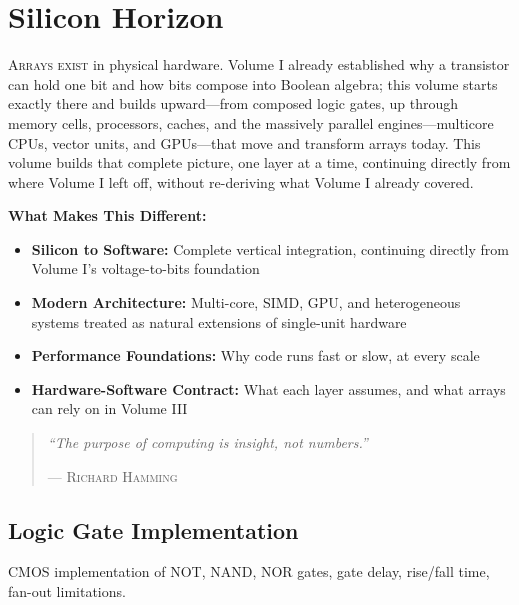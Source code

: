\part{Silicon Horizon}
\label{part:silicon-horizon}

\begin{volumeintro}
\lettrine[lines=3]{A}{rrays exist} in physical hardware. Volume I already established why a transistor can hold one bit and how bits compose into Boolean algebra; this volume starts exactly there and builds upward---from composed logic gates, up through memory cells, processors, caches, and the massively parallel engines---multicore CPUs, vector units, and GPUs---that move and transform arrays today. This volume builds that complete picture, one layer at a time, continuing directly from where Volume I left off, without re-deriving what Volume I already covered.

\vspace{1em}
\textbf{What Makes This Different:}
\begin{itemize}[noitemsep]
    \item \textbf{Silicon to Software:} Complete vertical integration, continuing directly from Volume I's voltage-to-bits foundation
    \item \textbf{Modern Architecture:} Multi-core, SIMD, GPU, and heterogeneous systems treated as natural extensions of single-unit hardware
    \item \textbf{Performance Foundations:} Why code runs fast or slow, at every scale
    \item \textbf{Hardware-Software Contract:} What each layer assumes, and what arrays can rely on in Volume III
\end{itemize}

\begin{quote}
\textit{``The purpose of computing is insight, not numbers.''}

\hfill--- \textsc{Richard Hamming}
\end{quote}
\end{volumeintro}


\chapter{Logic Gate Implementation}
CMOS implementation of NOT, NAND, NOR gates, gate delay, rise/fall time, fan-out limitations.

